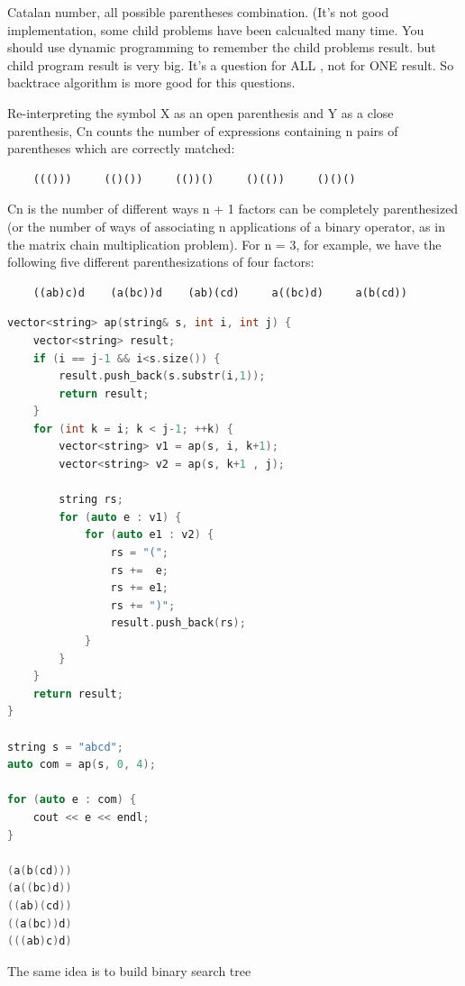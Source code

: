 \documentclass[a4paper,11pt,twoside]{book}
\begin{document}
	\par Catalan number, all possible parentheses combination. (It's not good implementation, some child problems have been calcualted many time.  You should use dynamic programming to remember the child problems result. but child program result is very big.  It's a question for ALL , not for ONE result. So backtrace algorithm is more good for this questions. 
	
	\par Re-interpreting the symbol X as an open parenthesis and Y as a close parenthesis, Cn counts the number of expressions containing n pairs of parentheses which are correctly matched:
\begin{lstlisting}
	((()))     (()())     (())()     ()(())     ()()()
\end{lstlisting}	
	
	Cn is the number of different ways n + 1 factors can be completely parenthesized (or the number of ways of associating n applications of a binary operator, as in the matrix chain multiplication problem). For n = 3, for example, we have the following five different parenthesizations of four factors:
	
\begin{lstlisting}	
	((ab)c)d    (a(bc))d    (ab)(cd)     a((bc)d)     a(b(cd))
\end{lstlisting}	
	
\begin{lstlisting}[frame=single, language=c++]
vector<string> ap(string& s, int i, int j) {
	vector<string> result;
	if (i == j-1 && i<s.size()) {
		result.push_back(s.substr(i,1));
		return result;
	}
	for (int k = i; k < j-1; ++k) {
		vector<string> v1 = ap(s, i, k+1);
		vector<string> v2 = ap(s, k+1 , j);
		
		string rs;
		for (auto e : v1) {
			for (auto e1 : v2) {
				rs = "(";
				rs +=  e;
				rs += e1;
				rs += ")";
				result.push_back(rs);
			}
		}
	}
	return result;
}

string s = "abcd";
auto com = ap(s, 0, 4);

for (auto e : com) {
	cout << e << endl;
}

(a(b(cd)))
(a((bc)d))
((ab)(cd))
((a(bc))d)
(((ab)c)d)	
\end{lstlisting}	
	
	\par The same idea is to build binary search tree
	
\end{document}
